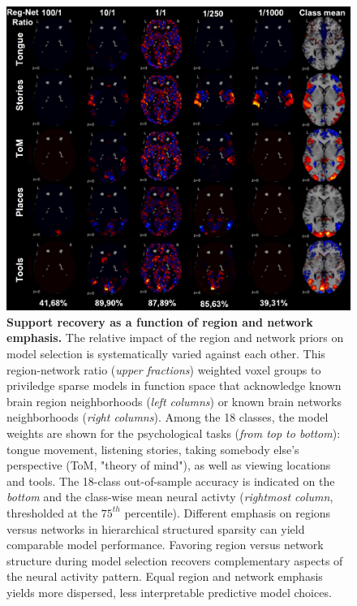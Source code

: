 \documentclass{article} %
\begin{document}
\begin{figure}
\begin{centering}
\includegraphics[width=1.00\textwidth]{figures/reg_net_ratio.pdf}
\end{centering}
\vspace{-0.6cm}
\caption{\textbf{Support recovery as a function of
region and network emphasis.}
The relative impact of the region and network priors
on model selection
is systematically varied against each other.
This region-network ratio (\textit{upper fractions}) weighted voxel groups
to priviledge sparse models in function space
that acknowledge known brain region neighborhoods
(\textit{left columns}) or
known brain networks neighborhoods
(\textit{right columns}).
Among the 18 classes, the model weights are shown for the psychological
tasks (\textit{from top to bottom}): tongue movement, listening stories,
taking somebody else's perspective (ToM, "theory of mind"),
as well as
viewing locations and tools.
The 18-class out-of-sample accuracy is indicated
on the \textit{bottom} and
the class-wise mean neural activty
(\textit{rightmost column}, thresholded at the $75^{th}$ percentile).
%
Different emphasis on regions versus networks
in hierarchical structured sparsity can
yield comparable model performance.
%
Favoring region versus network structure during model selection
recovers complementary aspects of the neural activity pattern.
%
Equal region and network emphasis yields more dispersed,
less interpretable predictive model choices.
}
\label{fig_regnetratio}
\end{figure}
\end{document}
